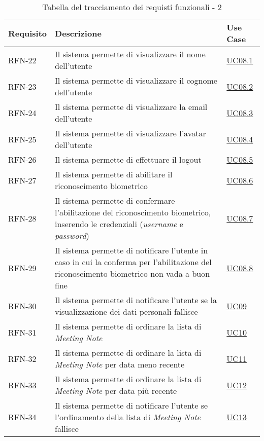 \begin{table}%
\caption{Tabella del tracciamento dei requisti funzionali - 2}
\label{tab:requisiti-funzionali-2}
\begin{tabularx}{\textwidth}{lXl}
\hline\hline
\textbf{Requisito} & \textbf{Descrizione} & \textbf{Use Case}\\
\hline
RFN-22 \label{RFN-22} & Il sistema permette di visualizzare il nome dell'utente & \hyperref[UC08.1]{UC08.1} \\
\hline
RFN-23 \label{RFN-23} & Il sistema permette di visualizzare il cognome dell'utente & \hyperref[UC08.2]{UC08.2} \\
\hline
RFN-24 \label{RFN-24} & Il sistema permette di visualizzare la email dell'utente & \hyperref[UC08.3]{UC08.3} \\
\hline
RFN-25 \label{RFN-25} & Il sistema permette di visualizzare l'avatar dell'utente & \hyperref[UC08.4]{UC08.4} \\
\hline
RFN-26 \label{RFN-26} & Il sistema permette di effettuare il logout & \hyperref[UC08.5]{UC08.5} \\
\hline
RFN-27 \label{RFN-27} & Il sistema permette di abilitare il riconoscimento biometrico & \hyperref[UC08.6]{UC08.6} \\
\hline
RFN-28 \label{RFN-28} & Il sistema permette di confermare l'abilitazione del riconoscimento biometrico, inserendo le credenziali (\emph{username} e \emph{password}) & \hyperref[UC08.7]{UC08.7} \\
\hline
RFN-29 \label{RFN-29} & Il sistema permette di notificare l'utente in caso in cui la conferma per l'abilitazione del riconoscimento biometrico non vada a buon fine & \hyperref[UC08.8]{UC08.8} \\
\hline
RFN-30 \label{RFN-30} & Il sistema permette di notificare l'utente se la visualizzazione dei dati personali fallisce & \hyperref[UC09]{UC09} \\
\hline
RFN-31 \label{RFN-31} & Il sistema permette di ordinare la lista di \emph{Meeting Note} & \hyperref[UC10]{UC10} \\
\hline
RFN-32 \label{RFN-32} & Il sistema permette di ordinare la lista di \emph{Meeting Note} per data meno recente & \hyperref[UC11]{UC11} \\
\hline
RFN-33 \label{RFN-33} & Il sistema permette di ordinare la lista di \emph{Meeting Note} per data più recente & \hyperref[UC12]{UC12} \\
\hline
RFN-34 \label{RFN-34} & Il sistema permette di notificare l'utente se l'ordinamento della lista di \emph{Meeting Note} fallisce & \hyperref[UC13]{UC13} \\

\end{tabularx}
\end{table}
